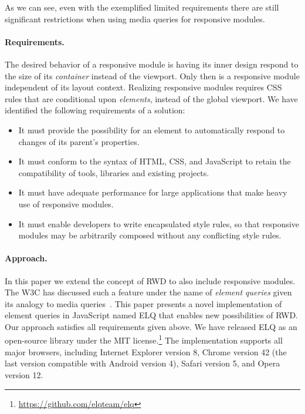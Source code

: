 \documentclass[sigconf,9pt]{acmart}
\newcommand{\elq}{ELQ}
\begin{document}
    As we can see, even with the exemplified limited requirements there are still significant restrictions when using media queries for responsive modules.


  \paragraph{Requirements.}\label{sec:reqs}
    The desired behavior of a responsive module is having its inner design respond to the size of its \emph{container} instead of the viewport.
    Only then is a responsive module independent of its layout context.
    Realizing responsive modules requires CSS rules that are conditional upon \emph{elements}, instead of the global viewport.
    We have identified the following requirements of a solution:

    \begin{itemize}
      \item
        It must provide the possibility for an element to automatically respond to changes of its parent's properties.
      \item
        It must conform to the syntax of HTML, CSS, and JavaScript to retain the compatibility of tools, libraries and existing projects.
      \item
        It must have adequate performance for large applications that make heavy use of responsive modules.
      \item
        It must enable developers to write encapsulated style rules, so that responsive modules may be arbitrarily composed without any conflicting style rules.
    \end{itemize}
  \paragraph{Approach.}
    In this paper we extend the concept of RWD to also include responsive modules.
    The W3C has discussed such a feature under the name of \emph{element queries} given its analogy to media queries~\cite{w3c_eq_mail}.
    This paper presents a novel implementation of element queries in JavaScript named \elq{} that enables new possibilities of RWD.
    Our approach satisfies all requirements given above.
    We have released ELQ as an open-source library under the MIT license.\footnote{\url{https://github.com/elqteam/elq}}
    The implementation supports all major browsers, including Internet Explorer version 8, Chrome version 42 (the last version compatible with Android version 4), Safari version 5, and Opera version 12.
\end{document}

